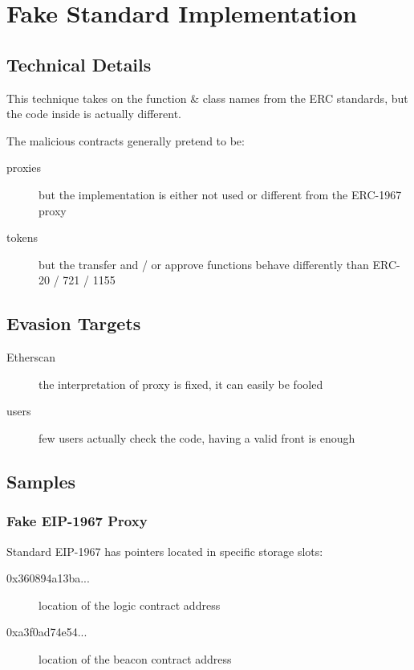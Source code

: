 \section{Fake Standard Implementation} \label{sec:fake-implementation}

\subsection{Technical Details}

This technique takes on the function \& class names from the ERC standards, but the code inside is actually different.

The malicious contracts generally pretend to be:

\begin{description}
\item[proxies]{but the implementation is either not used or different from the ERC-1967 proxy}
\item[tokens]{but the transfer and / or approve functions behave differently than ERC-20 / 721 / 1155}
\end{description}

\subsection{Evasion Targets}

\begin{description}
\item[Etherscan]{the interpretation of proxy is fixed, it can easily be fooled}
\item[users]{few users actually check the code, having a valid front is enough}
\end{description}

\subsection{Samples}

\subsubsection{Fake EIP-1967 Proxy}

Standard EIP-1967 \cite{eip-1967} has pointers located in specific storage slots:

\begin{description}
\item[0x360894a13ba...]{location of the logic contract address}
\item[0xa3f0ad74e54...]{location of the beacon contract address}
\end{description}

